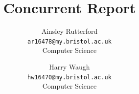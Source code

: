 \documentclass{article}
\begin{document}
\title{\vspace{-2.0cm}Concurrent Report}

\author{Ainsley Rutterford \\ \texttt{ar16478@my.bristol.ac.uk} \\ Computer Science
    \and Harry Waugh \\ \texttt{hw16470@my.bristol.ac.uk} \\ Computer Science}

\maketitle

\end{document}
